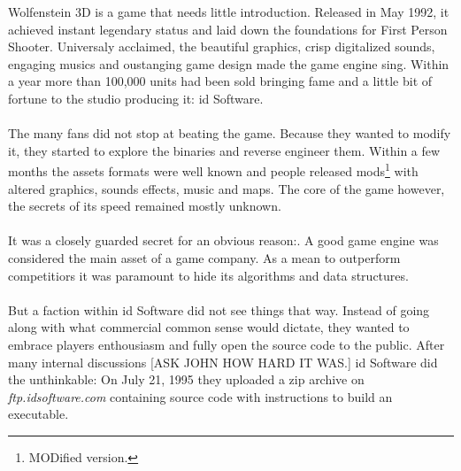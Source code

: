 Wolfenstein 3D is a game that needs little introduction. Released in May 1992, it achieved instant legendary status and laid down the foundations for First Person Shooter. Universaly acclaimed, the beautiful graphics, crisp digitalized sounds, engaging musics and oustanging game design made the game engine sing. Within a year more than 100,000 units had been sold bringing fame and a little bit of fortune to the studio producing it: id Software.\\
\\
The many fans did not stop at beating the game. Because they wanted to modify it, they started to explore the binaries and reverse engineer them. Within a few months the assets formats were well known and people released mods\footnote{MODified version.} with altered graphics, sounds effects, music and maps. The core of the game however, the secrets of its speed remained mostly unknown.\\
\\
It was a closely guarded secret for an obvious reason:. A good game engine was considered the main asset of a game company. As a mean to outperform competitiors it was paramount to hide its algorithms and data structures.\\
\\
But a faction within id Software did not see things that way. Instead of going along with what commercial common sense would dictate, they wanted to embrace players enthousiasm and fully open the source code to the public. After many internal discussions [ASK JOHN HOW HARD IT WAS.] id Software did the unthinkable: On July 21, 1995 they uploaded a zip archive on \emph{ftp.idsoftware.com} containing source code with instructions to build an executable.\\

